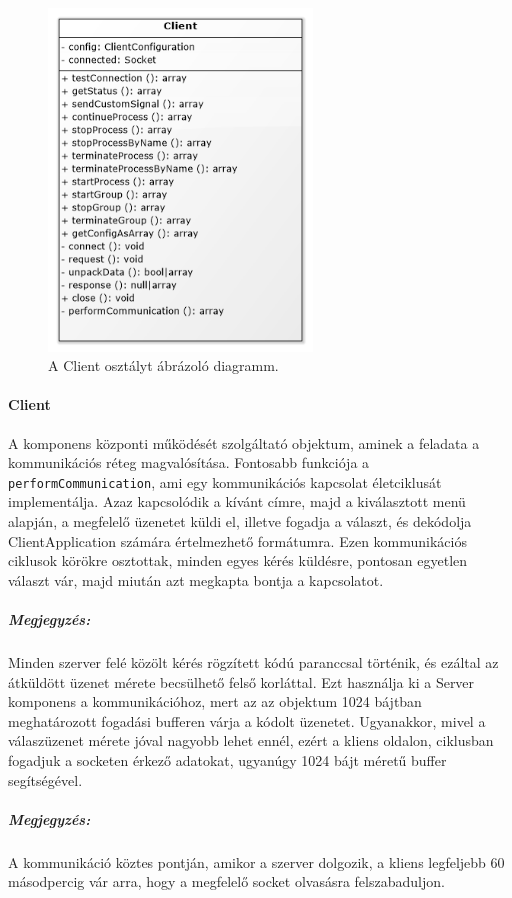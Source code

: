 \documentclass[12pt]{report}
\begin{document}
    \begin{figure}[ht]
       \centering
         \includegraphics[width=7cm]{pics/clie.png}
	  \caption{A Client osztályt ábrázoló diagramm.}
  \end{figure}
  
\paragraph{Client}
A komponens központi működését szolgáltató objektum, aminek a feladata a kommunikációs réteg magvalósítása. Fontosabb funkciója a \verb|performCommunication|, ami egy kommunikációs kapcsolat életciklusát implementálja. Azaz kapcsolódik a kívánt címre, majd a kiválasztott menü alapján, a megfelelő üzenetet küldi el, illetve fogadja a választ, és dekódolja  ClientApplication számára értelmezhető formátumra. Ezen kommunikációs ciklusok körökre osztottak, minden egyes kérés küldésre, pontosan egyetlen választ vár, majd miután azt megkapta bontja a kapcsolatot.
\subparagraph{Megjegyzés:}
Minden szerver felé közölt kérés rögzített kódú paranccsal történik, és ezáltal az átküldött üzenet mérete becsülhető felső korláttal. Ezt használja ki a Server komponens a kommunikációhoz, mert az az objektum 1024 bájtban meghatározott fogadási bufferen várja a kódolt üzenetet. Ugyanakkor, mivel a válaszüzenet mérete jóval nagyobb lehet ennél, ezért a kliens oldalon, ciklusban fogadjuk a socketen érkező adatokat, ugyanúgy 1024 bájt méretű buffer segítségével.
\subparagraph{Megjegyzés:}
A kommunikáció köztes pontján, amikor a szerver dolgozik, a kliens legfeljebb 60 másodpercig vár arra, hogy a megfelelő socket olvasásra felszabaduljon.
\end{document}
